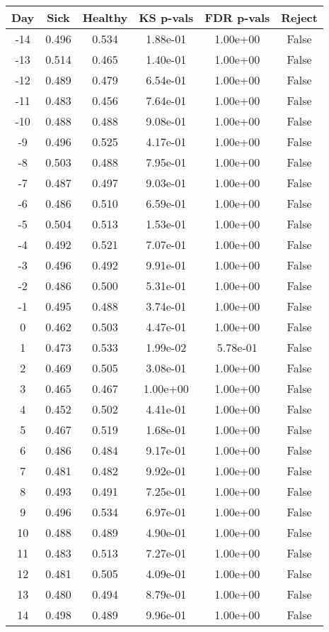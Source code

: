 \begin{tabular}{c|c|c|c|c|c}
Day &  Sick & Healthy &  KS p-vals & FDR p-vals & Reject\\
\hline
-14 & 0.496 &   0.534 &   1.88e-01 &   1.00e+00 &  False\\
-13 & 0.514 &   0.465 &   1.40e-01 &   1.00e+00 &  False\\
-12 & 0.489 &   0.479 &   6.54e-01 &   1.00e+00 &  False\\
-11 & 0.483 &   0.456 &   7.64e-01 &   1.00e+00 &  False\\
-10 & 0.488 &   0.488 &   9.08e-01 &   1.00e+00 &  False\\
 -9 & 0.496 &   0.525 &   4.17e-01 &   1.00e+00 &  False\\
 -8 & 0.503 &   0.488 &   7.95e-01 &   1.00e+00 &  False\\
 -7 & 0.487 &   0.497 &   9.03e-01 &   1.00e+00 &  False\\
 -6 & 0.486 &   0.510 &   6.59e-01 &   1.00e+00 &  False\\
 -5 & 0.504 &   0.513 &   1.53e-01 &   1.00e+00 &  False\\
 -4 & 0.492 &   0.521 &   7.07e-01 &   1.00e+00 &  False\\
 -3 & 0.496 &   0.492 &   9.91e-01 &   1.00e+00 &  False\\
 -2 & 0.486 &   0.500 &   5.31e-01 &   1.00e+00 &  False\\
 -1 & 0.495 &   0.488 &   3.74e-01 &   1.00e+00 &  False\\
  0 & 0.462 &   0.503 &   4.47e-01 &   1.00e+00 &  False\\
  1 & 0.473 &   0.533 &   1.99e-02 &   5.78e-01 &  False\\
  2 & 0.469 &   0.505 &   3.08e-01 &   1.00e+00 &  False\\
  3 & 0.465 &   0.467 &   1.00e+00 &   1.00e+00 &  False\\
  4 & 0.452 &   0.502 &   4.41e-01 &   1.00e+00 &  False\\
  5 & 0.467 &   0.519 &   1.68e-01 &   1.00e+00 &  False\\
  6 & 0.486 &   0.484 &   9.17e-01 &   1.00e+00 &  False\\
  7 & 0.481 &   0.482 &   9.92e-01 &   1.00e+00 &  False\\
  8 & 0.493 &   0.491 &   7.25e-01 &   1.00e+00 &  False\\
  9 & 0.496 &   0.534 &   6.97e-01 &   1.00e+00 &  False\\
 10 & 0.488 &   0.489 &   4.90e-01 &   1.00e+00 &  False\\
 11 & 0.483 &   0.513 &   7.27e-01 &   1.00e+00 &  False\\
 12 & 0.481 &   0.505 &   4.09e-01 &   1.00e+00 &  False\\
 13 & 0.480 &   0.494 &   8.79e-01 &   1.00e+00 &  False\\
 14 & 0.498 &   0.489 &   9.96e-01 &   1.00e+00 &  False\\
\end{tabular}